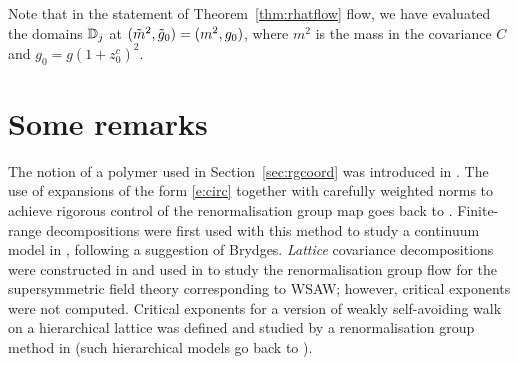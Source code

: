 Note that in the statement of Theorem~\ref{thm:rhatflow} flow, we have evaluated
the domains $\mathbb{D}_j$ at $(\tilde{m}^2, \tilde{g}_0) = (m^2, g_0)$, where $m^2$ is the
mass in the covariance $C$ and $g_0 = g (1 + z_0^c)^2$.


\section{Some remarks}

The notion of a polymer used in Section~\ref{sec:rgcoord} was introduced in
\cite{GK71}. The use of expansions of the form \eqref{e:circ} together with
carefully weighted norms to achieve rigorous control of the renormalisation
group map goes back to \cite{BY90}.
Finite-range decompositions were first used with this method to study a
continuum model in
\cite{MS00}, following a suggestion of Brydges. \emph{Lattice} covariance
decompositions were constructed in \cite{BGM04} and used in
\cite{MS08} to study the renormalisation group flow for the supersymmetric
field theory corresponding to WSAW; however, critical exponents were not
computed.
Critical exponents for a version of weakly self-avoiding walk on a hierarchical
lattice was defined and studied by a renormalisation group method in
\cite{BEI92,BI03c,BI03d} (such hierarchical models go back to \cite{Dyso69}).
